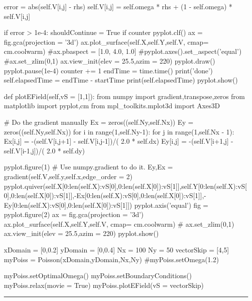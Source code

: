 \begin{enumerate}
\begin{codeexample}
\begin{VerbatimOut}{\listingFile}
                    error = abs(self.V[i,j] - rhs)
                    self.V[i,j] = self.omega * rhs + (1 - self.omega) * self.V[i,j]

                    if error > 1e-4:
                        shouldContinue = True
            if counter %
                pyplot.clf()
                ax = fig.gca(projection = '3d')
                ax.plot_surface(self.X,self.Y,self.V, cmap= cm.coolwarm)
                #ax.pbaspect = [1.0, 4.0, 1.0]
                #pyplot.axes().set_aspect('equal')
                #ax.set_zlim(0,1)
                ax.view_init(elev = 25.5,azim = 220)
                pyplot.draw()
                pyplot.pause(1e-4)
            counter += 1
        endTime = time.time()
        print('done')
        self.elapsedTime = endTime - startTime
        print(self.elapsedTime)
        pyplot.show()

    def plotEField(self,vS = [1,1]):
        from numpy import gradient,transpose,zeros
        from matplotlib import pyplot,cm
        from mpl_toolkits.mplot3d import Axes3D

        # Do the gradient manually
        Ex = zeros((self.Ny,self.Nx))
        Ey = zeros((self.Ny,self.Nx))
        for i in range(1,self.Ny-1):
            for j in range(1,self.Nx - 1):
                Ex[i,j] = -(self.V[i,j+1] - self.V[i,j-1])/( 2.0 * self.dx)
                Ey[i,j] = -(self.V[i+1,j] - self.V[i-1,j])/( 2.0 * self.dy)

        pyplot.figure(1)
        # Use numpy.gradient to do it.
        Ey,Ex = gradient(self.V,self.y,self.x,edge_order = 2)
        pyplot.quiver(self.X[0:len(self.X):vS[0],0:len(self.X[0]):vS[1]],self.Y[0:len(self.X):vS[0],0:len(self.X[0]):vS[1]],-Ex[0:len(self.X):vS[0],0:len(self.X[0]):vS[1]],-Ey[0:len(self.X):vS[0],0:len(self.X[0]):vS[1]])
        pyplot.axis('equal')
        fig = pyplot.figure(2)
        ax = fig.gca(projection = '3d')
        ax.plot_surface(self.X,self.Y,self.V, cmap= cm.coolwarm)
        #        ax.set_zlim(0,1)
        ax.view_init(elev = 25.5,azim = 220)
        pyplot.show()

xDomain = [0,0.2]
yDomain = [0,0.4]
Nx = 100
Ny = 50
vectorSkip = [4,5]
myPoiss = Poisson(xDomain,yDomain,Nx,Ny)
#myPoiss.setOmega(1.2)

myPoiss.setOptimalOmega()
myPoiss.setBoundaryConditions()
myPoiss.relax(movie = True)
myPoiss.plotEField(vS = vectorSkip)
\end{VerbatimOut}
\end{codeexample}
\else
\noindent\rule{5 in}{0.01 in}
\fi




\end{enumerate}
